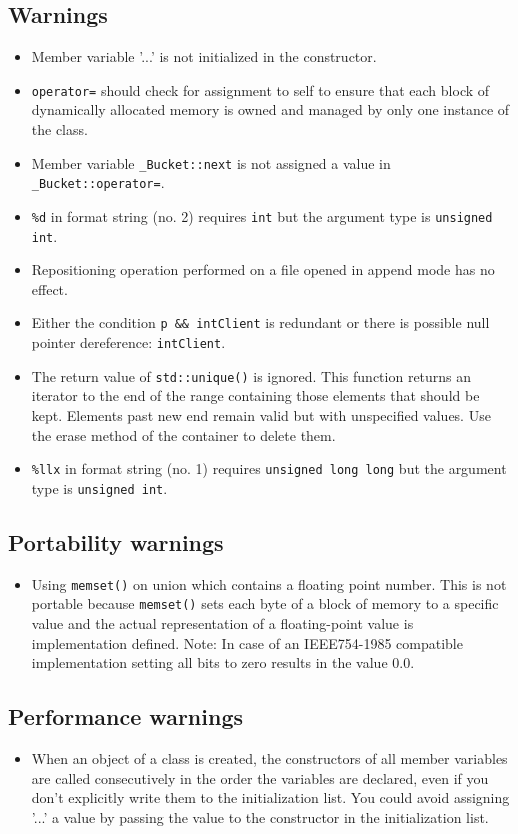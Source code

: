 \documentclass[10pt,a4paper]{article}
\begin{document}
\subsection*{Warnings}
\begin{itemize}
\item Member variable '...' is not initialized in the constructor.
\item \verb|operator=| should check for assignment to self to ensure that each block of dynamically allocated memory is owned and managed by only one instance of the class.
\item Member variable \verb|_Bucket::next| is not assigned a value in \verb|_Bucket::operator=|.
\item \verb|%d| in format string (no. 2) requires \verb|int| but the argument type is \verb|unsigned int|.
\item Repositioning operation performed on a file opened in append mode has no effect.
\item Either the condition \verb|p && intClient| is redundant or there is possible null pointer dereference: \verb|intClient|.
\item The return value of \verb|std::unique()| is ignored. This function returns an iterator to the end of the range containing those elements that should be kept. Elements past new end remain valid but with unspecified values. Use the erase method of the container to delete them.
\item \verb|%llx| in format string (no. 1) requires \verb|unsigned long long| but the argument type is \verb|unsigned int|.
\end{itemize}

\subsection*{Portability warnings}
\begin{itemize}
\item Using \verb|memset()| on union which contains a floating point number. This is not portable because \verb|memset()| sets each byte of a block of memory to a specific value and the actual representation of a floating-point value is implementation defined. Note: In case of an IEEE754-1985 compatible implementation setting all bits to zero results in the value 0.0.
\end{itemize}

\subsection*{Performance warnings}
\begin{itemize}
\item When an object of a class is created, the constructors of all member variables are called consecutively in the order the variables are declared, even if you don't explicitly write them to the initialization list. You could avoid assigning '...' a value by passing the value to the constructor in the initialization list.
\end{itemize}
\end{document}
